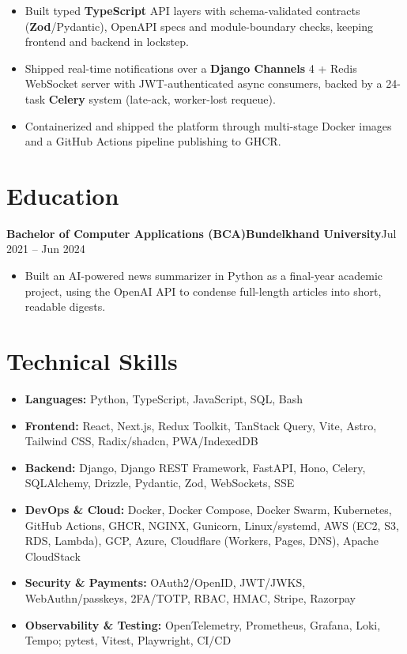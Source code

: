 \documentclass[11pt,a4paper]{article}
\newcommand{\entry}[3]{%
  \vspace{4.5pt}\noindent\textbf{#1}\hfill\textbf{#2}\hfill{\color{subtlegray}#3}\par\vspace{2pt}}
\begin{document}
\begin{itemize}
        budgets and visual-regression tests in CI.
  \item Built typed \textbf{TypeScript} API layers with schema-validated
        contracts (\textbf{Zod}/Pydantic), OpenAPI specs and module-boundary
        checks, keeping frontend and backend in lockstep.
  \item Shipped real-time notifications over a \textbf{Django Channels} 4 + Redis
        WebSocket server with JWT-authenticated async consumers, backed by a
        24-task \textbf{Celery} system (late-ack, worker-lost requeue).
  \item Containerized and shipped the platform through multi-stage Docker images
        and a GitHub Actions pipeline publishing to GHCR.
\end{itemize}

\section{Education}
\entry{Bachelor of Computer Applications (BCA)}{Bundelkhand University}{Jul 2021 -- Jun 2024}
\begin{itemize}
  \item Built an AI-powered news summarizer in Python as a final-year academic
        project, using the OpenAI API to condense full-length articles into short,
        readable digests.
\end{itemize}

\section{Technical Skills}
\begin{itemize}
  \item \textbf{Languages:} Python, TypeScript, JavaScript, SQL, Bash
  \item \textbf{Frontend:} React, Next.js, Redux Toolkit, TanStack Query, Vite, Astro, Tailwind CSS, Radix/shadcn, PWA/IndexedDB
  \item \textbf{Backend:} Django, Django REST Framework, FastAPI, Hono, Celery, SQLAlchemy, Drizzle, Pydantic, Zod, WebSockets, SSE
  \item \textbf{DevOps \& Cloud:} Docker, Docker Compose, Docker Swarm, Kubernetes, GitHub Actions, GHCR, NGINX, Gunicorn, Linux/systemd, AWS (EC2, S3, RDS, Lambda), GCP, Azure, Cloudflare (Workers, Pages, DNS), Apache CloudStack
  \item \textbf{Security \& Payments:} OAuth2/OpenID, JWT/JWKS, WebAuthn/passkeys, 2FA/TOTP, RBAC, HMAC, Stripe, Razorpay
  \item \textbf{Observability \& Testing:} OpenTelemetry, Prometheus, Grafana, Loki, Tempo; pytest, Vitest, Playwright, CI/CD
\end{itemize}
\end{document}
